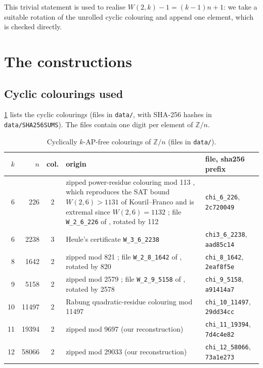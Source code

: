 \documentclass[11pt]{article}
\numberwithin{equation}{section}
\theoremstyle{definition}
\theoremstyle{remark}
\newcommand{\Z}{\mathbb Z}
\newcommand{\W}{W}
\begin{document}
This trivial statement is used to realise $\W(2,k)-1=(k-1)n+1$: we take a suitable rotation of
the unrolled cyclic colouring and append one element, which is checked directly.

\section{The constructions}\label{sec:constructions}

\subsection{Cyclic colourings used}
\cref{tab:moduli} lists the cyclic colourings (files in \texttt{data/}, with SHA-256 hashes in
\texttt{data/SHA256SUMS}).  The files contain one digit per element of $\Z/n$.

\begin{table}[ht]
\centering\footnotesize
\begin{tabular}{@{}rrc>{\raggedright\arraybackslash}p{6.4cm}l@{}}
\toprule
$k$ & $n$ & col. & origin & file, sha256 prefix\\
\midrule
6 & 226 & 2 & zipped power-residue colouring mod 113 \cite{HHLM07}, which reproduces the SAT bound $\W(2,6)>1131$ of Kouril--Franco \cite{KF05} and is extremal since $\W(2,6)=1132$ \cite{KP08}; file \texttt{W\_2\_6\_226} of \cite{HeuGit}, rotated by 112 & \texttt{chi\_6\_226}, \texttt{2c720049}\\
6 & 2238 & 3 & Heule's certificate \texttt{W\_3\_6\_2238} \cite{HeuGit,Heu17} & \texttt{chi3\_6\_2238}, \texttt{aad85c14}\\
8 & 1642 & 2 & zipped mod 821 \cite{HHLM07}; file \texttt{W\_2\_8\_1642} of \cite{HeuGit}, rotated by 820 & \texttt{chi\_8\_1642}, \texttt{2eaf8f5e}\\
9 & 5158 & 2 & zipped mod 2579 \cite{HHLM07}; file \texttt{W\_2\_9\_5158} of \cite{HeuGit}, rotated by 2578 & \texttt{chi\_9\_5158}, \texttt{a91414a7}\\
10 & 11497 & 2 & Rabung quadratic-residue colouring mod 11497 \cite{Rab79} & \texttt{chi\_10\_11497}, \texttt{29dd34cc}\\
11 & 19394 & 2 & zipped mod 9697 \cite{RL12} (our reconstruction) & \texttt{chi\_11\_19394}, \texttt{7d4c4e82}\\
12 & 58066 & 2 & zipped mod 29033 \cite{RL12} (our reconstruction) & \texttt{chi\_12\_58066}, \texttt{73a1e273}\\
\bottomrule
\end{tabular}
\caption{Cyclically $k$-AP-free colourings of $\Z/n$ (files in \texttt{data/}).}
\label{tab:moduli}
\end{table}
\end{document}
